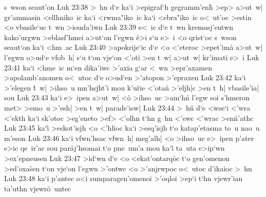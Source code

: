 s~wson
seaut'on\bibvsend
\vs Luk 23:38
>~hn
d`e
ka`i
>epigraf`h
gegramm'enh\r{}
>ep>
a>ut~w|
gr'ammasin
<ellhniko~ic
ka`i
<rwma"iko~ic
ka`i
<ebra"iko~ic
o<~ut'oc
>estin
<o
vbasile`uc
t~wn
>iouda'iwn\bibvsend
\vs Luk 23:39
e<~ic
d`e
t~wn
kremasj'entwn
kako'urgwn
>eblasf'hmei
a>ut`on
l'egwn
\r{e}>i
s`u
e>~i
<o
qrist`oc
s~wson
seaut`on
ka`i
<hm~ac\bibvsend
\vs Luk 23:40
>apokrije`ic
d`e
<o
<'eteroc
>epet'ima\r{}
a>ut~w|
l'egwn
o>ud`e
vfob~h|
s`u
t`on
vje`on
<'oti
>en
t~w|
a>ut~w|
kr'imati
e>~i\bibvsend
\vs Luk 23:41
ka`i
<hme~ic
m`en
dika'iwc
>'axia
g`ar
<~wn
>epr'axamen
>apolamb'anomen
o<~utoc
d`e
o>ud`en
>'atopon
>'epraxen\bibvsend
\vs Luk 23:42
ka`i
>'elegen
\r{t}~w|
>ihso~u
mn'hsjht'i
mou
k'u\r{r}ie
<'otan\r{}
>'eljh|c
>en
t~h|
vbasile'ia|
sou\bibvsend
\vs Luk 23:43
ka`i
e>~ipen
a>ut~w|
<o\r{}
>ihso~uc
>am`hn\r{}
l'egw
soi
s'hmeron
met>
>emo~u
>'esh|
>en
t~w|
parade'isw|\bibvsend
\vs Luk 23:44
>~hn\r{}
d`e
<wse`i
<'wra
<'ekth
ka`i
sk'otoc
>eg'eneto
>ef>
<'olhn
t`hn
g~hn
<'ewc
<'wrac
>en\r{n}'athc\bibvsend
{}
\vs Luk 23:45
ka`i\r{}
>eskot'isjh
<o
<'hlioc
ka`i
>esq'isjh
t`o
katap'etasma
to~u
nao~u
m'eson\bibvsend
\vs Luk 23:46
ka`i
vfwn'hsac
vfwn~h|
meg'alh|
<o
>ihso~uc
e>~ipen
p'ater
e>ic
qe~ir'ac
sou
par\r{a}j'hsomai
t`o
pne~um'a
mou
ka`i\r{}
ta~uta
e>ip`wn
>ex'epneusen\bibvsend
\vs Luk 23:47
>id`wn
d`e
<o
<ekat'ontarq\r{o}c
t`o
gen'omenon
>ed'oxa\r{s}en
t`on
vje`on
l'egwn
>'ontwc
<o
>'anjrwpoc
o<~utoc
d'ikaioc
>~hn\bibvsend
\vs Luk 23:48
ka`i
p'antec
o<i
sumparagen'omenoi
>'oqloi
>ep`i
t`hn
vjewr'ian
ta'uthn
vjewr\r{o}~untec
